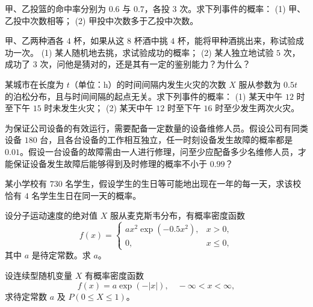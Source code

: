 \begin{homework}[2.9]
甲、乙投篮的命中率分别为 $0.6$ 与 $0.7$，各投 $3$ 次。求下列事件的概率：  
(1) 甲、乙投中次数相等；  
(2) 甲投中次数多于乙投中次数。
\end{homework}

\begin{homework}[2.10]
甲、乙两种酒各 $4$ 杯，如果从这 $8$ 杯酒中挑 $4$ 杯，能将甲种酒挑出来，称试验成功一次。  
(1) 某人随机地去挑，求试验成功的概率；  
(2) 某人独立地试验 $5$ 次，成功了 $3$ 次，问他是猜对的，还是其有一定的鉴别能力？为什么？
\end{homework}

\begin{homework}[2.11]
某城市在长度为 $t$（单位：h）的时间间隔内发生火灾的次数 $X$ 服从参数为 $0.5t$ 的泊松分布，且与时间间隔的起点无关。求下列事件的概率：  
(1) 某天中午 $12$ 时至下午 $15$ 时未发生火灾；  
(2) 某天中午 $12$ 时至下午 $16$ 时至少发生两次火灾。
\end{homework}

\begin{homework}[2.12]
为保证公司设备的有效运行，需要配备一定数量的设备维修人员。假设公司有同类设备 $180$ 台，且各台设备的工作相互独立，任一时刻设备发生故障的概率都是 $0.01$。假设一台设备的故障需由一人进行修理，问至少应配备多少名维修人员，才能保证设备发生故障后能够得到及时修理的概率不小于 $0.99$？
\end{homework}

\begin{homework}[2.13]
某小学校有 $730$ 名学生，假设学生的生日等可能地出现在一年的每一天，求该校恰有 $4$ 名学生生日在同一天的概率。
\end{homework}

\begin{homework}[2.14]
设分子运动速度的绝对值 $X$ 服从麦克斯韦分布，有概率密度函数
\[
f(x) =
\begin{cases}
a x^2 \exp(-0.5 x^2), & x > 0, \\[6pt]
0, & x \leq 0,
\end{cases}
\]
其中 $a$ 是待定常数。求 $a$。
\end{homework}

\begin{homework}[2.15]
设连续型随机变量 $X$ 有概率密度函数
\[
f(x) = a \exp(-|x|), \quad -\infty < x < \infty,
\]
求待定常数 $a$ 及 $P(0 \leq X \leq 1)$。
\end{homework}


